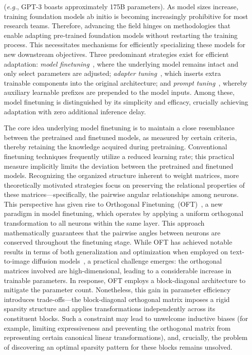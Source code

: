 (\emph{e.g.}, GPT-3 boasts approximately 175B parameters). As model sizes increase, training foundation models ab initio is becoming increasingly prohibitive for most research teams. Therefore, advancing the field hinges on methodologies that enable adapting pre-trained foundation models without restarting the training process. This necessitates mechanisms for efficiently specializing these models for new downstream objectives. Three predominant strategies exist for efficient adaptation: \emph{model finetuning}~\cite{hulora2022,zaken2022bitfit,guo2020parameter,raffel2020exploring,qiu2023controlling,zhang2022adaptive,chavan2023one}, where the underlying model remains intact and only select parameters are adjusted; \emph{adapter tuning}~\cite{rebuffi2017learning,houlsby2019parameter,pfeiffer2020adapterfusion,lin2020exploring,he2021towards}, which inserts extra trainable components into the original architecture; and \emph{prompt tuning}~\cite{li2021prefix,lester2021power}, whereby auxiliary learnable prefixes are prepended to the model inputs. Among these, model finetuning is distinguished by its simplicity and efficacy, crucially achieving adaptation with zero additional inference delay.

The core idea underlying model finetuning is to maintain a close resemblance between the pretrained and finetuned models, as measured by certain criteria, thereby retaining the knowledge acquired during pretraining. Conventional finetuning techniques frequently utilize a reduced learning rate; this practical measure implicitly limits the deviation between the pretrained and finetuned models. Recognizing the organized structure inherent to weight matrices, more theoretically motivated strategies focus on preserving the relational properties of these matrices—specifically, the pairwise angular relationships among neurons. This perspective has given rise to Orthogonal Finetuning~(OFT)~\cite{qiu2023controlling}, a new paradigm in model finetuning, which operates by applying a uniform orthogonal transformation to all neurons within the same layer. This approach mathematically guarantees that the pairwise angles between neurons are conserved throughout the finetuning stage. While OFT has achieved notable results in terms of both generalization and optimization when employed on text-to-image diffusion models~\cite{qiu2023controlling}, a practical challenge emerges: the orthogonal matrices involved are high-dimensional, leading to a considerable increase in trainable parameters. In response, OFT employs a block-diagonal architecture to mitigate the parameter count. Nonetheless, this gain in parameter efficiency introduces trade-offs—the block-diagonal orthogonal matrix imposes a rigid sparsity structure and applies transformations independently across its constituent blocks. Such a constraint may lead to unwelcome inductive biases (for example, limiting expressiveness and preventing the orthogonal matrix from representing certain canonical linear transformations), and, crucially, the problem of discovering an optimal sparsity pattern for these blocks remains unsolved.

